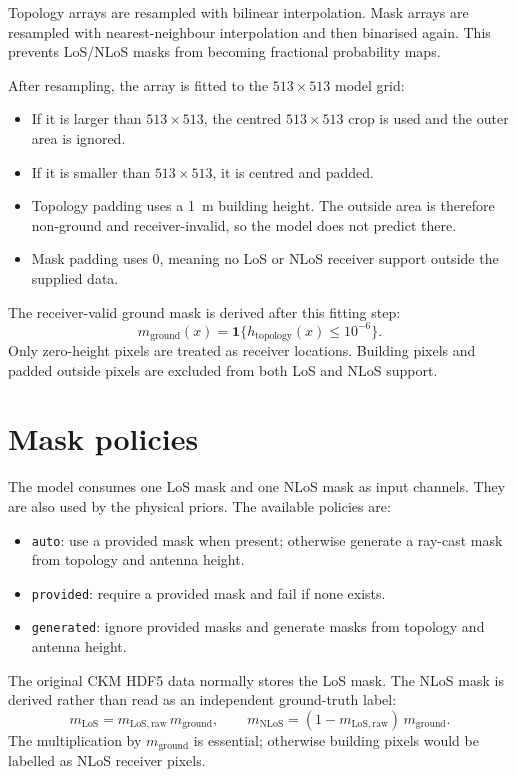 Topology arrays are resampled with bilinear interpolation. Mask arrays are
resampled with nearest-neighbour interpolation and then binarised again. This
prevents LoS/NLoS masks from becoming fractional probability maps.

After resampling, the array is fitted to the \(513\times513\) model grid:

\begin{itemize}
\setlength\itemsep{0.15em}
  \item If it is larger than \(513\times513\), the centred \(513\times513\)
        crop is used and the outer area is ignored.
  \item If it is smaller than \(513\times513\), it is centred and padded.
  \item Topology padding uses a \SI{1}{m} building height. The outside area
        is therefore non-ground and receiver-invalid, so the model does not
        predict there.
  \item Mask padding uses 0, meaning no LoS or NLoS receiver support outside
        the supplied data.
\end{itemize}

The receiver-valid ground mask is derived after this fitting step:
\[
  m_{\mathrm{ground}}(x) =
  \mathbf{1}\{h_{\mathrm{topology}}(x) \le 10^{-6}\}.
\]
Only zero-height pixels are treated as receiver locations. Building pixels and
padded outside pixels are excluded from both LoS and NLoS support.

\section{Mask policies}

The model consumes one LoS mask and one NLoS mask as input channels. They are
also used by the physical priors. The available policies are:

\begin{itemize}
\setlength\itemsep{0.15em}
  \item \texttt{auto}: use a provided mask when present; otherwise generate a
        ray-cast mask from topology and antenna height.
  \item \texttt{provided}: require a provided mask and fail if none exists.
  \item \texttt{generated}: ignore provided masks and generate masks from
        topology and antenna height.
\end{itemize}

The original CKM HDF5 data normally stores the LoS mask. The NLoS mask is
derived rather than read as an independent ground-truth label:
\[
  m_{\mathrm{LoS}} = m_{\mathrm{LoS,raw}}\,m_{\mathrm{ground}},
  \qquad
  m_{\mathrm{NLoS}} = (1-m_{\mathrm{LoS,raw}})\,m_{\mathrm{ground}}.
\]
The multiplication by \(m_{\mathrm{ground}}\) is essential; otherwise building
pixels would be labelled as NLoS receiver pixels.

